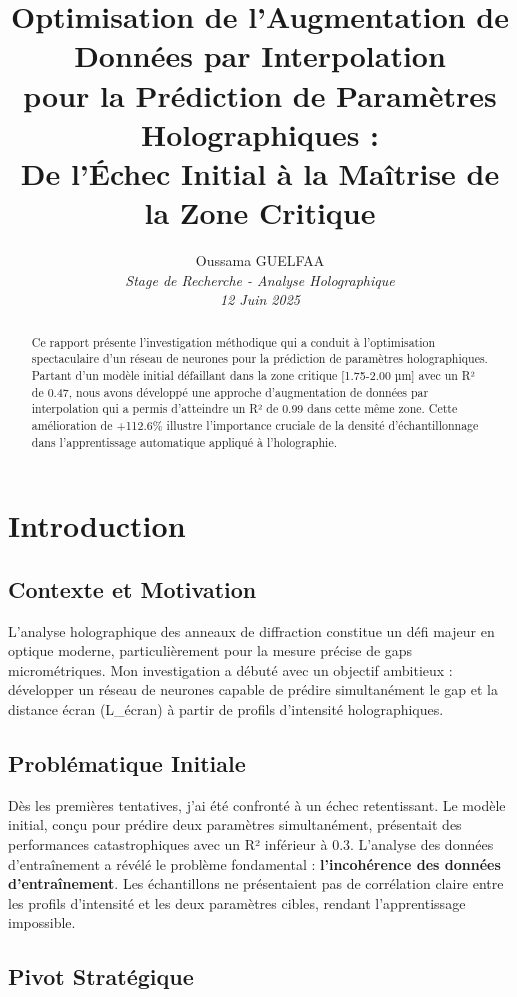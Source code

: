 \documentclass[11pt,a4paper,twocolumn]{article}
\title{\textbf{Optimisation de l'Augmentation de Données par Interpolation \\
pour la Prédiction de Paramètres Holographiques : \\
De l'Échec Initial à la Maîtrise de la Zone Critique}}
\author{Oussama GUELFAA \\
\textit{Stage de Recherche - Analyse Holographique} \\
\textit{12 Juin 2025}}
\date{}
\begin{document}
\maketitle

\begin{abstract}
Ce rapport présente l'investigation méthodique qui a conduit à l'optimisation spectaculaire d'un réseau de neurones pour la prédiction de paramètres holographiques. Partant d'un modèle initial défaillant dans la zone critique [1.75-2.00 µm] avec un R² de 0.47, nous avons développé une approche d'augmentation de données par interpolation qui a permis d'atteindre un R² de 0.99 dans cette même zone. Cette amélioration de +112.6\% illustre l'importance cruciale de la densité d'échantillonnage dans l'apprentissage automatique appliqué à l'holographie.
\end{abstract}

\section{Introduction}

\subsection{Contexte et Motivation}

L'analyse holographique des anneaux de diffraction constitue un défi majeur en optique moderne, particulièrement pour la mesure précise de gaps micrométriques. Mon investigation a débuté avec un objectif ambitieux : développer un réseau de neurones capable de prédire simultanément le gap et la distance écran (L\_écran) à partir de profils d'intensité holographiques.

\subsection{Problématique Initiale}

Dès les premières tentatives, j'ai été confronté à un échec retentissant. Le modèle initial, conçu pour prédire deux paramètres simultanément, présentait des performances catastrophiques avec un R² inférieur à 0.3. L'analyse des données d'entraînement a révélé le problème fondamental : \textbf{l'incohérence des données d'entraînement}. Les échantillons ne présentaient pas de corrélation claire entre les profils d'intensité et les deux paramètres cibles, rendant l'apprentissage impossible.

\subsection{Pivot Stratégique}
\end{document}
